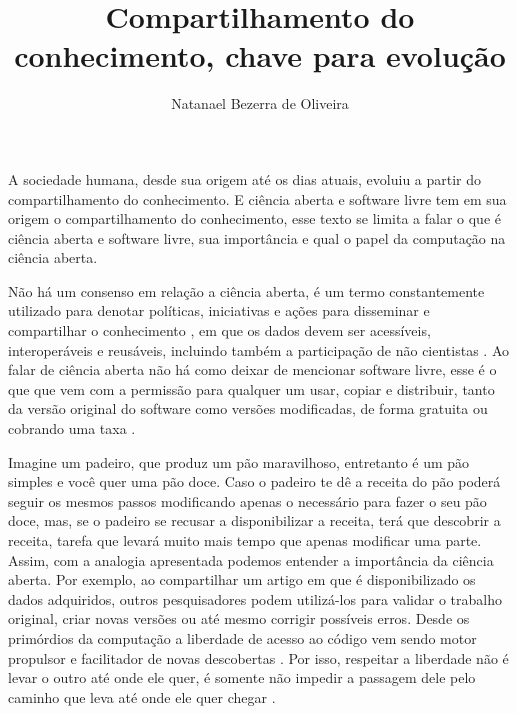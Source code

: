 \documentclass[12pt]{article}
\begin{document}
 

\title{Compartilhamento do conhecimento, chave para evolução}

\author{Natanael Bezerra de Oliveira}

\address{Instituto de Computação -- Universidade Federal do Amazonas
  (UFAM)\\
  Av. Gen. Rodrigo Octávio, 6200, Setor Norte, Coroado - 69080-900 - Manaus - AM
}


\maketitle

A sociedade humana, desde sua origem até os dias atuais, evoluiu a partir do compartilhamento do conhecimento. E ciência aberta e software livre tem em sua origem o compartilhamento do conhecimento, esse texto se limita a falar o que é ciência aberta e software livre, sua importância e qual o papel da computação na ciência aberta. 

Não há um consenso em relação a ciência aberta, é um termo constantemente utilizado para denotar políticas, iniciativas e ações para disseminar e compartilhar o conhecimento \cite{clau_22_2}, em que os dados devem ser acessíveis, interoperáveis e reusáveis, incluindo também a participação de não cientistas \cite{clau_22}.  Ao falar de ciência aberta não há como deixar de mencionar software livre, esse é o que que vem com a permissão para qualquer um usar, copiar e distribuir, tanto da versão original do software como versões modificadas, de forma gratuita ou cobrando uma taxa \cite{Revolucao}.

Imagine um padeiro, que produz um pão maravilhoso, entretanto é um pão simples e você quer uma pão doce. Caso o padeiro te dê a receita do pão poderá seguir os mesmos passos modificando apenas o necessário para fazer o seu pão doce, mas, se o padeiro se recusar a disponibilizar a receita, terá que descobrir a receita, tarefa que levará muito mais tempo que apenas modificar uma parte. Assim, com a analogia apresentada podemos entender a importância da ciência aberta. Por exemplo, ao compartilhar um artigo em que é disponibilizado os dados adquiridos, outros pesquisadores podem utilizá-los para validar o trabalho original, criar novas versões ou até mesmo corrigir possíveis erros. Desde os primórdios da computação a liberdade de acesso ao código vem sendo motor propulsor e facilitador de novas descobertas \cite{Revolucao}. Por isso, respeitar a liberdade não é levar o outro até onde ele quer, é somente não impedir a passagem dele pelo caminho que leva até onde ele quer chegar \cite{Revolucao}.
\end{document}
